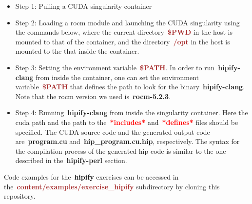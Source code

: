 \begin{itemize}
    \item Step 1: Pulling a CUDA singularity container
    
    \item Step 2: Loading a rocm module and launching the CUDA singularity using the commands below, where the current directory~\textbf{\textcolor{brown}{\$PWD}} in the host is mounted to that of the container, and the directory~\textbf{\textcolor{brown}{/opt}} in the host is mounted to the that inside the container.
    
    \item Step 3: Setting the environment variable~\textbf{\textcolor{brown}{\$PATH}}. In order to run~\textbf{hipify-clang} from inside the container, one can set the environment variable~\textbf{\textcolor{brown}{\$PATH}} that defines the path to look for the binary~\textbf{hipify-clang}. Note that the rocm version we used is~\textbf{rocm-5.2.3}.
    
    \item Step 4: Running~\textbf{hipify-clang} from inside the singularity container. Here the cuda path and the path to the~\textbf{\textcolor{red}{*includes*}} and~\textbf{\textcolor{red}{*defines*}} files should be specified. The CUDA source code and the generated output code are~\textbf{program.cu} and~\textbf{hip\_program.cu.hip}, respectively. The syntax for the compilation process of the generated hip code is similar to the one described in the~\textbf{hipify-perl} section.
    
\end{itemize}


\par
Code examples for the~\textbf{hipify} exercises can be accessed in the~\textbf{\textcolor{brown}{content/examples/exercise\_hipify}} subdirectory by cloning this repository.


